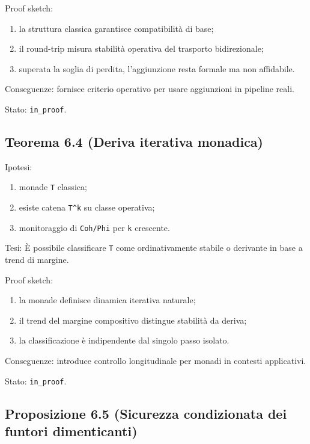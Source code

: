 Proof sketch:

\begin{enumerate}
\def\labelenumi{\arabic{enumi}.}
\tightlist
\item
  la struttura classica garantisce compatibilità di base;
\item
  il round-trip misura stabilità operativa del trasporto bidirezionale;
\item
  superata la soglia di perdita, l'aggiunzione resta formale ma non affidabile.
\end{enumerate}

Conseguenze:
fornisce criterio operativo per usare aggiunzioni in pipeline reali.

Stato: \texttt{in\_proof}.

\subsection{Teorema 6.4 (Deriva iterativa monadica)}

Ipotesi:

\begin{enumerate}
\def\labelenumi{\arabic{enumi}.}
\tightlist
\item
  monade \texttt{T} classica;
\item
  esiste catena \texttt{T\^{}k} su classe operativa;
\item
  monitoraggio di \texttt{Coh/Phi} per \texttt{k} crescente.
\end{enumerate}

Tesi:
È possibile classificare \texttt{T} come ordinativamente stabile o derivante in base a trend di margine.

Proof sketch:

\begin{enumerate}
\def\labelenumi{\arabic{enumi}.}
\tightlist
\item
  la monade definisce dinamica iterativa naturale;
\item
  il trend del margine compositivo distingue stabilità da deriva;
\item
  la classificazione è indipendente dal singolo passo isolato.
\end{enumerate}

Conseguenze:
introduce controllo longitudinale per monadi in contesti applicativi.

Stato: \texttt{in\_proof}.

\subsection{Proposizione 6.5 (Sicurezza condizionata dei funtori dimenticanti)}

